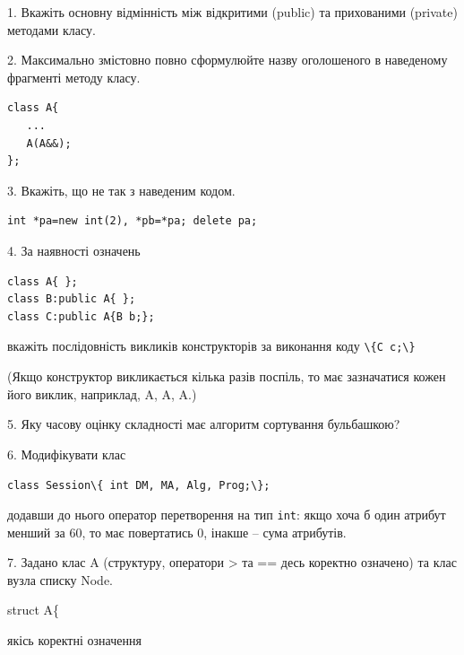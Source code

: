 \documentclass[12pt, ukrainian]{article}
\def\code#1{\Verb!#1!}
\begin{document}
{%
1. Вкажіть основну відмінність між відкритими (public) та прихованими (private) методами класу.%
\par
\vspace{2mm}
2. Максимально змістовно повно сформулюйте назву оголошеного в наведеному фрагменті методу класу.
\vspace{-3mm}
\begin{verbatim}class A{
   ...
   A(A&&);
};\end{verbatim}
\vspace{-3mm}
\par
\vspace{2mm}
3. Вкажіть, що не так з наведеним кодом.
\vspace{-3mm}
\begin{verbatim}int *pa=new int(2), *pb=*pa; delete pa;\end{verbatim}
\vspace{-3mm}
\par
\vspace{2mm}
4. За наявності означень
\vspace{-3mm}
\begin{verbatim}
class A{ };
class B:public A{ };
class C:public A{B b;};\end{verbatim}
\vspace{-3mm}
вкажіть послідовність викликів конструкторів за виконання коду \code{\{C c;\}} 

(Якщо конструктор викликається кілька разів поспіль, то має зазначатися кожен його виклик, наприклад, A, A, A.)

\vspace{2mm}
5. Яку часову оцінку складності має алгоритм сортування бульбашкою?
\par
\vspace{2mm}
6. Модифікувати клас 

\qquad\code{class Session\{ int DM, MA, Alg, Prog;\};} 


додавши до нього оператор перетворення на тип \code{int}: якщо хоча б один атрибут менший за 60, то має повертатись 0, інакше -- сума атрибутів.%
\par
\vspace{2mm}
7. 
Задано клас A (структуру, оператори > та == десь коректно означено) та клас вузла списку Node.

struct A\{

\quad  якісь коректні означення 

}
\end{document}
